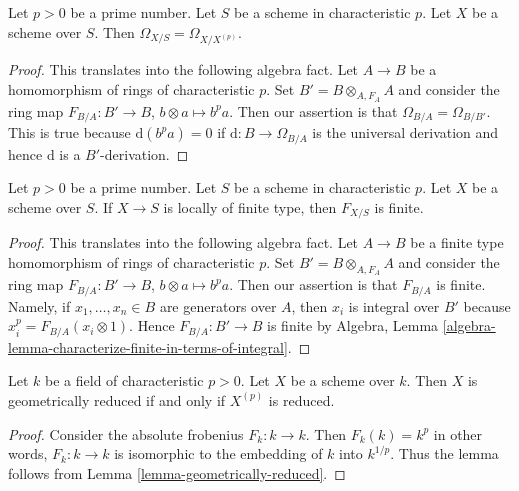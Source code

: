 \begin{lemma}
\label{lemma-relative-frobenius-omega}
Let $p > 0$ be a prime number. Let $S$ be a scheme in characteristic $p$.
Let $X$ be a scheme over $S$. Then $\Omega_{X/S} = \Omega_{X/X^{(p)}}$.
\end{lemma}

\begin{proof}
This translates into the following algebra fact.
Let $A \to B$ be a homomorphism of rings of characteristic $p$.
Set $B' = B \otimes_{A, F_A} A$ and consider the ring map
$F_{B/A} : B' \to B$, $b \otimes a \mapsto b^pa$.
Then our assertion is that $\Omega_{B/A} = \Omega_{B/B'}$.
This is true because $\text{d}(b^pa) = 0$ if
$\text{d} : B \to \Omega_{B/A}$ is the universal derivation
and hence $\text{d}$ is a $B'$-derivation.
\end{proof}

\begin{lemma}
\label{lemma-relative-frobenius-finite}
Let $p > 0$ be a prime number. Let $S$ be a scheme in characteristic $p$.
Let $X$ be a scheme over $S$. If $X \to S$ is locally of finite type,
then $F_{X/S}$ is finite.
\end{lemma}

\begin{proof}
This translates into the following algebra fact.
Let $A \to B$ be a finite type homomorphism of rings of characteristic $p$.
Set $B' = B \otimes_{A, F_A} A$ and consider the ring map
$F_{B/A} : B' \to B$, $b \otimes a \mapsto b^pa$.
Then our assertion is that $F_{B/A}$ is finite.
Namely, if $x_1, \ldots, x_n \in B$ are generators over $A$,
then $x_i$ is integral over $B'$ because $x_i^p = F_{B/A}(x_i \otimes 1)$.
Hence $F_{B/A} : B' \to B$ is finite by
Algebra, Lemma \ref{algebra-lemma-characterize-finite-in-terms-of-integral}.
\end{proof}

\begin{lemma}
\label{lemma-geometrically-reduced-p}
Let $k$ be a field of characteristic $p > 0$. Let $X$ be a scheme over $k$.
Then $X$ is geometrically reduced if and only if $X^{(p)}$ is reduced.
\end{lemma}

\begin{proof}
Consider the absolute frobenius $F_k : k \to k$. Then $F_k(k) = k^p$
in other words, $F_k : k \to k$ is isomorphic to the embedding of
$k$ into $k^{1/p}$. Thus the lemma follows from
Lemma \ref{lemma-geometrically-reduced}.
\end{proof}

